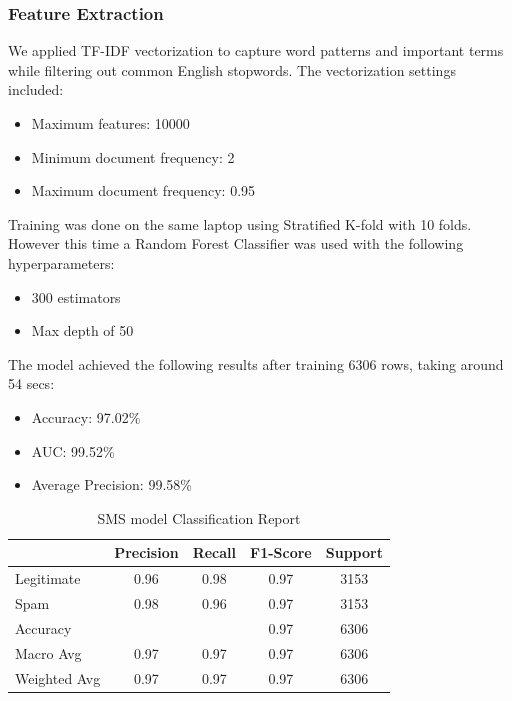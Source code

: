\documentclass{article}
\begin{document}
\subsubsection*{Feature Extraction}

We applied TF-IDF vectorization to capture word patterns and important terms while filtering out common English stopwords. The vectorization settings included:

\begin{itemize}
    \item Maximum features: 10000
    \item Minimum document frequency: 2
    \item Maximum document frequency: 0.95
\end{itemize}

\noindent
Training was done on the same laptop using Stratified K-fold with 10 folds. However this time a Random Forest Classifier was used with the following hyperparameters:

\begin{itemize}
    \item 300 estimators
    \item Max depth of 50
\end{itemize}

\noindent
The model achieved the following results after training 6306 rows, taking around 54 secs:

\begin{itemize}
    \item Accuracy: 97.02\%
    \item AUC: 99.52\%
    \item Average Precision: 99.58\%
\end{itemize}

\begin{table}[htbp]
    \centering
    \caption{SMS model Classification Report}
    \begin{tabular}{l c c c c}
    \toprule
     & Precision & Recall & F1-Score & Support \\
    \midrule
    Legitimate & 0.96 & 0.98 & 0.97 & 3153 \\
    Spam & 0.98 & 0.96 & 0.97 & 3153 \\
    \midrule
    Accuracy & & & 0.97 & 6306 \\
    Macro Avg & 0.97 & 0.97 & 0.97 & 6306 \\
    Weighted Avg & 0.97 & 0.97 & 0.97 & 6306 \\
    \bottomrule
    \end{tabular}
    \label{tab:classification_report_2}
\end{table}
\end{document}

